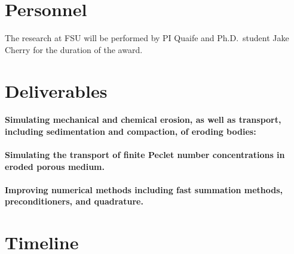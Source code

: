 \documentclass[11pt]{article}
\begin{document}
\section*{Personnel}
The research at FSU will be performed by PI Quaife and Ph.D.~student
Jake Cherry for the duration of the award.

\section*{Deliverables}
\paragraph{Simulating mechanical and chemical erosion, as well as
transport, including sedimentation and compaction, of eroding bodies:}
    
\paragraph{Simulating the transport of finite Peclet number
concentrations in eroded porous medium.}

\paragraph{Improving numerical methods including fast summation methods,
preconditioners, and quadrature.}


\section*{Timeline}
\end{document}
